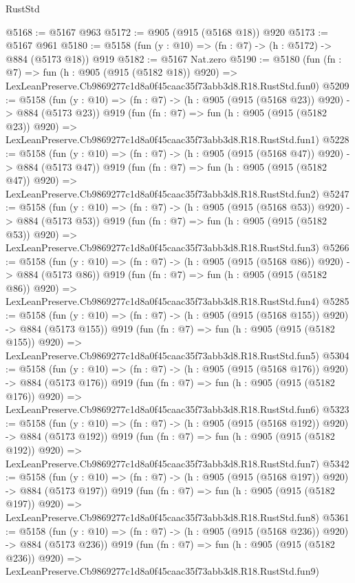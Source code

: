 \begin{lexlean}{RustStd}
\begin{coremodule}
@5168 := @5167 @963
@5172 := @905 (@915 (@5168 @18)) @920
@5173 := @5167 @961
@5180 := @5158 (fun (y : @10) => (fn : @7) -> (h : @5172) -> @884 (@5173 @18)) @919
@5182 := @5167 Nat.zero
@5190 := @5180
    (fun (fn : @7) =>
    fun (h : @905 (@915 (@5182 @18)) @920) =>
    LexLeanPreserve.Cb9869277c1d8a0f45caac35f73abb3d8.R18.RustStd.fun0)
@5209 := @5158
    (fun (y : @10) => (fn : @7) -> (h : @905 (@915 (@5168 @23)) @920) -> @884 (@5173 @23))
    @919
    (fun (fn : @7) =>
    fun (h : @905 (@915 (@5182 @23)) @920) =>
    LexLeanPreserve.Cb9869277c1d8a0f45caac35f73abb3d8.R18.RustStd.fun1)
@5228 := @5158
    (fun (y : @10) => (fn : @7) -> (h : @905 (@915 (@5168 @47)) @920) -> @884 (@5173 @47))
    @919
    (fun (fn : @7) =>
    fun (h : @905 (@915 (@5182 @47)) @920) =>
    LexLeanPreserve.Cb9869277c1d8a0f45caac35f73abb3d8.R18.RustStd.fun2)
@5247 := @5158
    (fun (y : @10) => (fn : @7) -> (h : @905 (@915 (@5168 @53)) @920) -> @884 (@5173 @53))
    @919
    (fun (fn : @7) =>
    fun (h : @905 (@915 (@5182 @53)) @920) =>
    LexLeanPreserve.Cb9869277c1d8a0f45caac35f73abb3d8.R18.RustStd.fun3)
@5266 := @5158
    (fun (y : @10) => (fn : @7) -> (h : @905 (@915 (@5168 @86)) @920) -> @884 (@5173 @86))
    @919
    (fun (fn : @7) =>
    fun (h : @905 (@915 (@5182 @86)) @920) =>
    LexLeanPreserve.Cb9869277c1d8a0f45caac35f73abb3d8.R18.RustStd.fun4)
@5285 := @5158
    (fun (y : @10) => (fn : @7) -> (h : @905 (@915 (@5168 @155)) @920) -> @884 (@5173 @155))
    @919
    (fun (fn : @7) =>
    fun (h : @905 (@915 (@5182 @155)) @920) =>
    LexLeanPreserve.Cb9869277c1d8a0f45caac35f73abb3d8.R18.RustStd.fun5)
@5304 := @5158
    (fun (y : @10) => (fn : @7) -> (h : @905 (@915 (@5168 @176)) @920) -> @884 (@5173 @176))
    @919
    (fun (fn : @7) =>
    fun (h : @905 (@915 (@5182 @176)) @920) =>
    LexLeanPreserve.Cb9869277c1d8a0f45caac35f73abb3d8.R18.RustStd.fun6)
@5323 := @5158
    (fun (y : @10) => (fn : @7) -> (h : @905 (@915 (@5168 @192)) @920) -> @884 (@5173 @192))
    @919
    (fun (fn : @7) =>
    fun (h : @905 (@915 (@5182 @192)) @920) =>
    LexLeanPreserve.Cb9869277c1d8a0f45caac35f73abb3d8.R18.RustStd.fun7)
@5342 := @5158
    (fun (y : @10) => (fn : @7) -> (h : @905 (@915 (@5168 @197)) @920) -> @884 (@5173 @197))
    @919
    (fun (fn : @7) =>
    fun (h : @905 (@915 (@5182 @197)) @920) =>
    LexLeanPreserve.Cb9869277c1d8a0f45caac35f73abb3d8.R18.RustStd.fun8)
@5361 := @5158
    (fun (y : @10) => (fn : @7) -> (h : @905 (@915 (@5168 @236)) @920) -> @884 (@5173 @236))
    @919
    (fun (fn : @7) =>
    fun (h : @905 (@915 (@5182 @236)) @920) =>
    LexLeanPreserve.Cb9869277c1d8a0f45caac35f73abb3d8.R18.RustStd.fun9)

\end{coremodule}
\end{lexlean}
